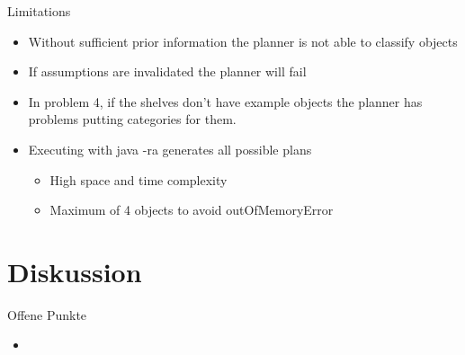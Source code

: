 \documentclass{beamer}
\begin{document}
\begin{frame}{Limitations}
  \begin{itemize}
    \item Without sufficient prior information the planner is not able to classify objects
    \item If assumptions are invalidated the planner will fail
    \item In problem 4, if the shelves don't have example objects  the planner has problems putting categories for them.
    \item Executing with java -ra generates all possible plans
      \begin{itemize}
        \item High space and time complexity
        \item Maximum of 4 objects to avoid outOfMemoryError
      \end{itemize}
  \end{itemize}
\end{frame}


\section{Diskussion}

\begin{frame}{Offene Punkte}
  \begin{itemize}

    \item
  \end{itemize}
\end{frame}


%
\end{document}
